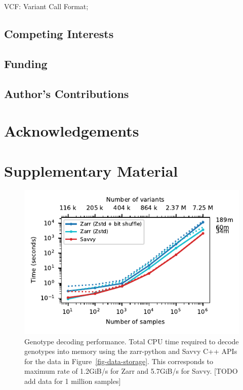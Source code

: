 \documentclass[a4paper,num-refs]{oup-contemporary}
\begin{document}
VCF: Variant Call Format;

\subsection{Competing Interests}

\subsection{Funding}

\subsection{Author's Contributions}

\section{Acknowledgements}




\clearpage
\renewcommand\thefigure{S\arabic{figure}}
\setcounter{figure}{0}
\renewcommand\thetable{S\arabic{table}}
\setcounter{table}{0}

\section*{Supplementary Material}

\begin{figure}
\includegraphics{figures/whole-matrix-decode}
\caption{Genotype decoding performance.
Total CPU time required to decode genotypes into memory using the zarr-python
and Savvy C++ APIs for the data in Figure~\ref{fig-data-storage}.
This corresponds to maximum rate of 1.2GiB/s for Zarr and 5.7GiB/s
for Savvy. [TODO add data for 1 million samples]
\label{fig-whole-matrix-decode}}
\end{figure}
\end{document}
